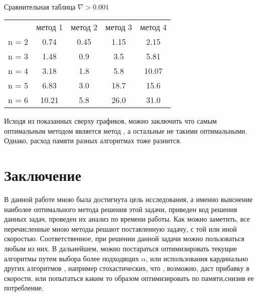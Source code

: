 \documentclass[ 12pt,x11names]{article}
\begin{document}
 \\
Сравнительная  таблица
$\nabla > 0.001 $
\begin{center}
\begin{tabular}{ c c c c c}
       & метод 1 & метод 2 & метод 3 & метод 4 \\
 n = 2 & 0.74    & 0.45     & 1.15 & 2.15 \\
 n = 3 & 1.48    & 0.9      & 3.5 & 5.81 \\
 n = 4 & 3.18    & 1.8      & 5.8 & 10.07 \\
 n = 5 & 6.83    & 3.0      & 18.7 & 15.6 \\
 n = 6 & 10.21   & 5.8      & 26.0 & 31.0 \\
\end{tabular}
\end{center}
Исходя из показанных сверху графиков, можно заключить что самым оптимальным методом является метод      , а остальные не такими оптимальными.
Однако, расход памяти  разных алгоритмах тоже разнится.
 \newpage
    \section{Заключение}
    В данной работе мною была достигнута цель исследования, а именно выяснение наиболее оптимального метода решения этой задачи, приведен  код решения данных задач, проведен их анализ по времени работы.
    Как можно заметить, все перечисленные мною методы решают поставленную задачу, с той или иной скоростью. Соответственное, при решении данной задачи можно пользоваться любым из них.
    В дальнейшем, можно постараться оптимизировать текущие алгоритмы  путем выбора более подходящих $\alpha$, или использования кардинально других алгоритмов , например стохастических, что , возможно, даст прибавку в скорости, или попытаться каким то образом оптимизировать по памяти,снизив ее потребление.
\newpage
\end{document}
